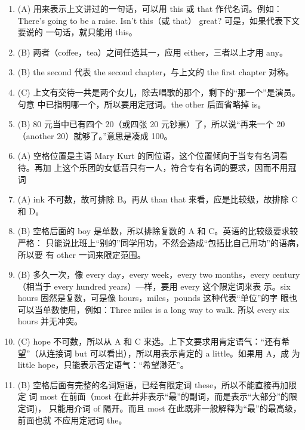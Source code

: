 \begin{enumerate}
\item (A) 用来表示上文讲过的一句话，可以用 this 或 that 作代名词。例如：There's
  going to be a raise. Isn't this（或 that） great? 可是，如果代表下文要说的
  一句话，就只能用 this。

\item (B) 两者（coffee，tea）之间任选其一，应用 either，三者以上才用 any。

\item (B) the second 代表 the second chapter，与上文的 the first chapter 对称。

\item (C) 上文有交待一共是两个女儿，除去唱歌的那个，剩下的“那一个”是演员。句意
  中已指明哪一个，所以要用定冠词。the other 后面省略掉 is。

\item (B) 80 元当中已有四个 20（或四张 20 元钞票）了，所以说“再来一个 20（another 20）就够了。”意思是凑成 100。

\item (A) 空格位置是主语 Mary Kurt 的同位语，这个位置倾向于当专有名词看待。再加
  上这个乐团的女低音只有一人，符合专有名词的要求，因而不用冠词

\item (A) ink 不可数，故可排除 B。再从 than that 来看，应是比较级，故排除 C 和 D。

\item (B) 空格后面的 boy 是单数，所以排除复数的 A 和 C。英语的比较级要求较严格：
  只能说比班上“别的”同学用功，不然会造成“包括比自己用功”的语病，所以要
  有 other 一词来限定范围。

\item (B) 多久一次，像 every day，every week，every two months，every
  century（相当于 every hundred years）—样，要用 every 这个限定词来表
  示。six hours 固然是复数，可是像 hours，miles，pounds 这种代表“单位”的字
  眼也可以当单数使用，例如：Three miles is a long way to walk. 所以 every
  six hours 并无冲突。

\item (C) hope 不可数，所以从 A 和 C 来选。上下文要求用肯定语气：“还有希
  望”（从连接词 but 可以看出），所以用表示肯定的 a little。如果用 A，成
  为 little hope，只能表示否定语气：“希望渺茫”。


\item (B) 空格后面有完整的名词短语，已经有限定词 these，所以不能直接再加限定
  词 most 在前面（most 在此并非表示“最”的副词，而是表示“大部分”的限定词)，
  只能用介词 of 隔开。而且 most 在此既非一般解释为“最”的最高级，前面也就
  不应用定冠词 the。

\end{enumerate}

